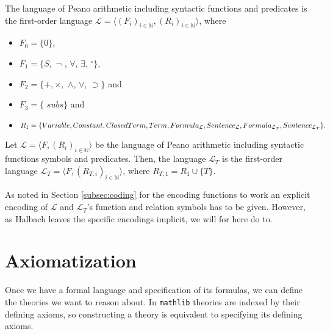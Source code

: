 \begin{definition}\label{def:l}
    The language of Peano arithmetic including syntactic functions and predicates is the first-order language $\mathcal{L} = \langle (F_i)_{i \in \mathbb{N}}, (R_i)_{i \in \mathbb{N}} \rangle$, where
    \begin{itemize}
        \item $F_0 = \{0\}$,
        \item $F_1 = \{S,$ \d{$\neg$} , \d{$\forall$}, \d{$\exists$}, ${^\circ}\}$,
        \item $F_2 = \{+,\times,$ \d{$\wedge$}, \d{$\vee$}, \d{$\supset$}$\}$ and
        \item $F_3 = \{$ \d{$subs$}$\}$ and
        \item $R_1 = \{Variable, Constant, ClosedTerm, Term, Formula_{\mathcal{L}}, Sentence_{\mathcal{L}}, \\ Formula_{\mathcal{L}_T}, Sentence_{\mathcal{L}_T}\}.$
    \end{itemize}
\end{definition} 

\begin{definition}\label{def:lt}
    Let $\mathcal{L} = \langle F, (R_i)_{i \in \mathbb{N}} \rangle$ be the language of Peano arithmetic including syntactic functions symbols and predicates. Then, the language $\mathcal{L}_T$ is the first-order language $\mathcal{L}_T = \langle F, (R_{T,i})_{i \in \mathbb{N}} \rangle$, where $R_{T,1} = R_1 \cup \{T\}$.
\end{definition}

As noted in Section \ref{subsec:coding} for the encoding functions to work an explicit encoding of $\mathcal{L}$ and $\mathcal{L}_T$'s function and relation symbols has to be given. However, as Halbach leaves the specific encodings implicit, we will for here do to.

\section{Axiomatization}\label{subsec:axiomatization}
Once we have a formal language and specification of its formulas, we can define the theories we want to reason about. In \texttt{mathlib} theories are indexed by their defining axioms, so constructing a theory is equivalent to specifying its defining axioms. 

